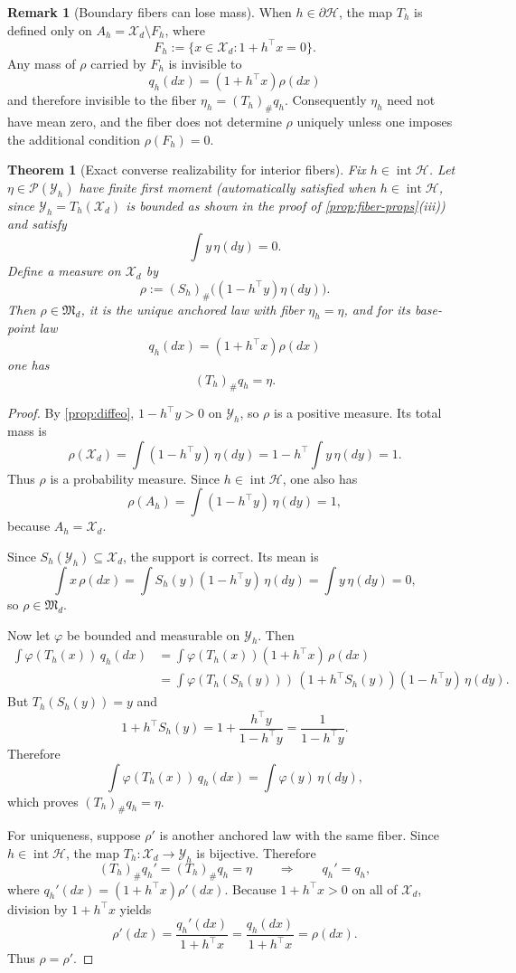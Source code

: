 \documentclass[11pt]{amsart}
\newtheorem{theorem}{Theorem}[section]
\theoremstyle{definition}
\newtheorem{remark}[remark]{Remark}
\newcommand{\cP}{\mathcal P}
\newcommand{\cX}{\mathcal X}
\newcommand{\cY}{\mathcal Y}
\newcommand{\cH}{\mathcal H}
\newcommand{\fM}{\mathfrak M}
\begin{document}
\begin{remark}[Boundary fibers can lose mass]\label{rem:boundary-fibers}
When $h\in\partial \cH$, the map $T_h$ is defined only on $A_h=\cX_d\setminus F_h$, where
\[
F_h:=\{x\in \cX_d:1+h^\top x=0\}.
\]
Any mass of $\rho$ carried by $F_h$ is invisible to
\[
q_h(dx)=(1+h^\top x)\rho(dx)
\]
and therefore invisible to the fiber $\eta_h=(T_h)_\# q_h$. Consequently $\eta_h$ need not have mean zero, and the fiber does not determine $\rho$ uniquely unless one imposes the additional condition $\rho(F_h)=0$.
\end{remark}

\begin{theorem}[Exact converse realizability for interior fibers]\label{thm:converse-fiber}
Fix $h\in\operatorname{int}\cH$. Let $\eta\in \cP(\cY_h)$ have finite first moment (automatically satisfied when $h\in\operatorname{int}\cH$, since $\cY_h=T_h(\cX_d)$ is bounded as shown in the proof of \cref{prop:fiber-props}(iii)) and satisfy
\[
\int y\,\eta(dy)=0.
\]
Define a measure on $\cX_d$ by
\[
\rho:=(S_h)_\#\bigl((1-h^\top y)\eta(dy)\bigr).
\]
Then $\rho\in \fM_d$, it is the unique anchored law with fiber $\eta_h=\eta$, and for its base-point law
\[
q_h(dx)=(1+h^\top x)\rho(dx)
\]
one has
\[
(T_h)_\# q_h=\eta.
\]
\end{theorem}

\begin{proof}
By \cref{prop:diffeo}, $1-h^\top y>0$ on $\cY_h$, so $\rho$ is a positive measure. Its total mass is
\[
\rho(\cX_d)=\int (1-h^\top y)\,\eta(dy)=1-h^\top \int y\,\eta(dy)=1.
\]
Thus $\rho$ is a probability measure. Since $h\in \operatorname{int}\cH$, one also has
\[
\rho(A_h)=\int (1-h^\top y)\,\eta(dy)=1,
\]
because $A_h=\cX_d$.

Since $S_h(\cY_h)\subseteq \cX_d$, the support is correct. Its mean is
\[
\int x\,\rho(dx)=\int S_h(y)(1-h^\top y)\,\eta(dy)=\int y\,\eta(dy)=0,
\]
so $\rho\in \fM_d$.

Now let $\varphi$ be bounded and measurable on $\cY_h$. Then
\[
\begin{aligned}
\int \varphi(T_h(x))\,q_h(dx)
&=
\int \varphi(T_h(x))(1+h^\top x)\,\rho(dx)\\
&=
\int \varphi(T_h(S_h(y)))\,(1+h^\top S_h(y))(1-h^\top y)\,\eta(dy).
\end{aligned}
\]
But $T_h(S_h(y))=y$ and
\[
1+h^\top S_h(y)=1+\frac{h^\top y}{1-h^\top y}=\frac{1}{1-h^\top y}.
\]
Therefore
\[
\int \varphi(T_h(x))\,q_h(dx)=\int \varphi(y)\,\eta(dy),
\]
which proves $(T_h)_\# q_h=\eta$.

For uniqueness, suppose $\rho'$ is another anchored law with the same fiber. Since $h\in \operatorname{int}\cH$, the map $T_h:\cX_d\to \cY_h$ is bijective. Therefore
\[
(T_h)_\# q_h'=(T_h)_\# q_h=\eta
\qquad\Longrightarrow\qquad
q_h'=q_h,
\]
where $q_h'(dx)=(1+h^\top x)\rho'(dx)$. Because $1+h^\top x>0$ on all of $\cX_d$, division by $1+h^\top x$ yields
\[
\rho'(dx)=\frac{q_h'(dx)}{1+h^\top x}=\frac{q_h(dx)}{1+h^\top x}=\rho(dx).
\]
Thus $\rho=\rho'$.
\end{proof}
\end{document}
